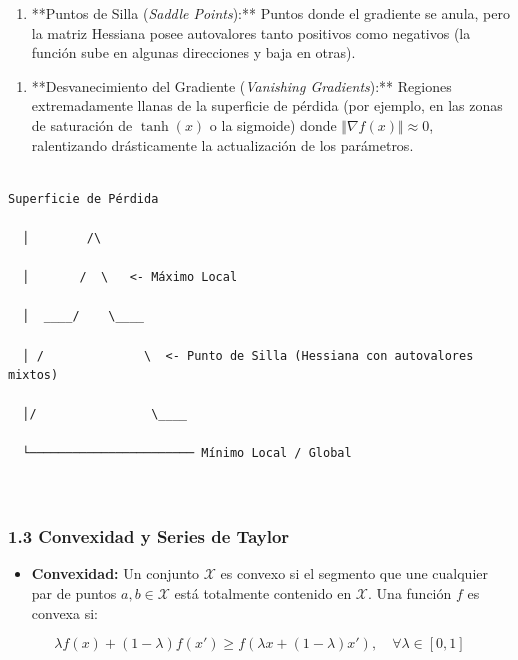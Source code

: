 \documentclass[11pt,oneside]{article}
\begin{document}
\begin{enumerate}

\item **Puntos de Silla (\emph{Saddle Points}):** Puntos donde el gradiente se anula, pero la matriz Hessiana posee autovalores tanto positivos como negativos (la función sube en algunas direcciones y baja en otras).

\end{enumerate}

\begin{enumerate}

\item **Desvanecimiento del Gradiente (\emph{Vanishing Gradients}):** Regiones extremadamente llanas de la superficie de pérdida (por ejemplo, en las zonas de saturación de \(\tanh(x)\) o la sigmoide) donde \(\Vert{}\nabla f(x)\Vert{} \approx 0\), ralentizando drásticamente la actualización de los parámetros.

\end{enumerate}

\begin{lstlisting}

Superficie de Pérdida

  │        /\

  │       /  \   <- Máximo Local

  │  ____/    \____

  │ /              \  <- Punto de Silla (Hessiana con autovalores mixtos)

  │/                \____

  └─────────────────────── Mínimo Local / Global



\end{lstlisting}

\subsubsection{1.3 Convexidad y Series de Taylor}

\begin{itemize}

\item \textbf{Convexidad:} Un conjunto \(\mathcal{X}\) es convexo si el segmento que une cualquier par de puntos \(a, b \in \mathcal{X}\) está totalmente contenido en \(\mathcal{X}\). Una función \(f\) es convexa si:

\end{itemize}

\[\lambda f(x) + (1-\lambda)f(x') \ge f(\lambda x + (1-\lambda)x'), \quad \forall \lambda \in [0, 1]\]
\end{document}
